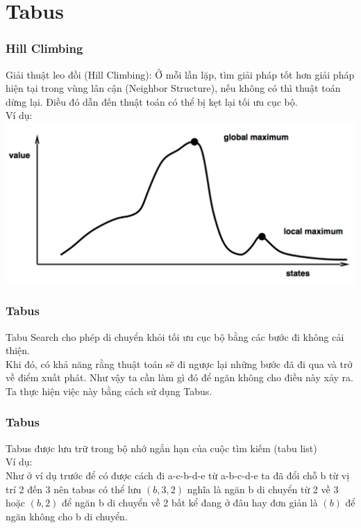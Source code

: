 \documentclass[12pt]{beamer}
\begin{document}
	\section{Tabus}
	\begin{frame}
		\frametitle{Hill Climbing}
		Giải thuật leo đồi (Hill Climbing): Ở mỗi lần lặp, tìm giải pháp tốt hơn giải pháp hiện tại trong vùng lân cận (Neighbor Structure), nếu không có thì thuật toán dừng lại. Điều đó dẫn đến thuật toán có thể bị kẹt lại tối ưu cục bộ.\\
		Ví dụ:\\
		\includegraphics[scale=0.4]{HillClimbing.png}\\
	\end{frame}

	\begin{frame}
		\frametitle{Tabus}
		Tabu Search cho phép di chuyển khỏi tối ưu cục bộ bằng các bước đi không cải thiện.\\
		Khi đó, có khả năng rằng thuật toán sẽ đi ngược lại những bước đã đi qua và trở về điểm xuất phát. Như vậy ta cần làm gì đó để ngăn không cho điều này xảy ra.\\
		Ta thực hiện việc này bằng cách sử dụng Tabus.
	\end{frame}

	\begin{frame}
		\frametitle{Tabus}
		Tabus được lưu trữ trong bộ nhớ ngắn hạn của cuộc tìm kiếm (tabu list)\\
		Ví dụ:\\
		Như ở ví dụ trước để có được cách đi a-c-b-d-e từ a-b-c-d-e ta đã đổi chỗ b từ vị trí 2 đến 3 nên tabus có thể lưu $(b, 3, 2)$ nghĩa là ngăn b di chuyển từ 2 về 3 hoặc $(b, 2)$ để ngăn b di chuyển về 2 bất kể đang ở đâu hay đơn giản là $(b)$ để ngăn không cho b di chuyển.
	\end{frame}
	
\end{document}
